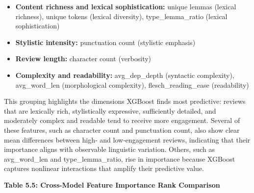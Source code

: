 \begin{itemize}

\item \textbf{Content richness and lexical sophistication:}  
unique lemmas (lexical richness), unique tokens (lexical diversity), type\_lemma\_ratio (lexical sophistication)

\item \textbf{Stylistic intensity:}  
punctuation count (stylistic emphasis)

\item \textbf{Review length:}  
character count (verbosity)

\item \textbf{Complexity and readability:}  
avg\_dep\_depth (syntactic complexity), avg\_word\_len (morphological complexity), flesch\_reading\_ease (readability)

\end{itemize}

This grouping highlights the dimensions XGBoost finds most predictive:
reviews that are lexically rich, stylistically expressive, sufficiently
detailed, and moderately complex and readable tend to receive more
engagement. Several of these features, such as character count and
punctuation count, also show clear mean differences between high‑ and
low‑engagement reviews, indicating that their importance aligns with
observable linguistic variation. Others, such as avg\_word\_len and
type\_lemma\_ratio, rise in importance because XGBoost captures
nonlinear interactions that amplify their predictive value.

\textbf{Table 5.5: Cross-Model Feature Importance Rank Comparison}

